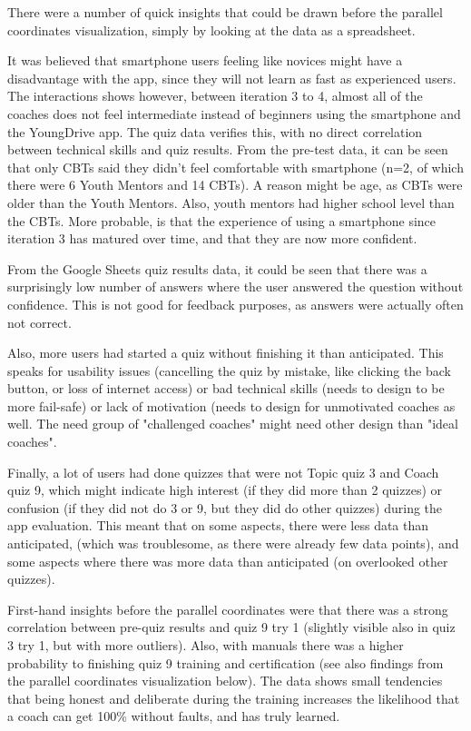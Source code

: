 There were a number of quick insights that could be drawn before the parallel coordinates visualization, simply by looking at the data as a spreadsheet.

It was believed that smartphone users feeling like novices might have a disadvantage with the app, since they will not learn as fast as experienced users. The interactions shows however, between iteration 3 to 4, almost all of the coaches does not feel intermediate instead of beginners using the smartphone and the YoungDrive app. The quiz data verifies this, with no direct correlation between technical skills and quiz results. From the pre-test data, it can be seen that only CBTs said they didn't feel comfortable with smartphone (n=2, of which there were 6 Youth Mentors and 14 CBTs). A reason might be age, as CBTs were older than the Youth Mentors. Also, youth mentors had higher school level than the CBTs. More probable, is that the experience of using a smartphone since iteration 3 has matured over time, and that they are now more confident. %

From the Google Sheets quiz results data, it could be seen that there was a surprisingly low number of answers where the user answered the question without confidence.  This is not good for feedback purposes, as answers were actually often not correct.

Also, more users had started a quiz without finishing it than anticipated. This speaks for usability issues (cancelling the quiz by mistake, like clicking the back button, or loss of internet access) or bad technical skills (needs to design to be more fail-safe) or lack of motivation (needs to design for unmotivated coaches as well. The need group of "challenged coaches" might need other design than "ideal coaches".

Finally, a lot of users had done quizzes that were not Topic quiz 3 and Coach quiz 9, which might indicate high interest (if they did more than 2 quizzes) or confusion (if they did not do 3 or 9, but they did do other quizzes) during the app evaluation. This meant that on some aspects, there were less data than anticipated, (which was troublesome, as there were already few data points), and some aspects where there was more data than anticipated (on overlooked other quizzes).

First-hand insights before the parallel coordinates were that there was a strong correlation between pre-quiz results and quiz 9 try 1 (slightly visible also in quiz 3 try 1, but with more outliers). Also, with manuals there was a higher probability to finishing quiz 9 training and certification (see also findings from the parallel coordinates visualization below). The data shows small tendencies that being honest and deliberate during the training increases the likelihood that a coach can get 100\% without faults, and has truly learned.

